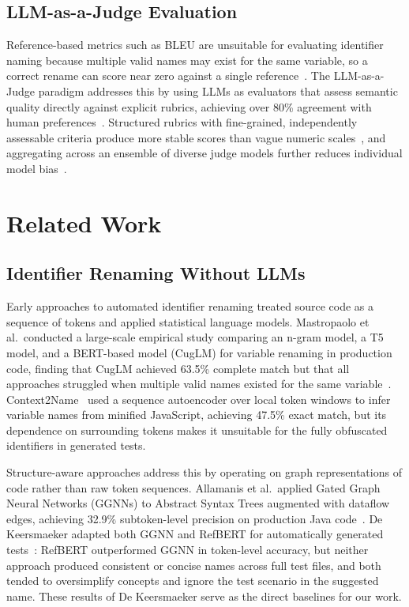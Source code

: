 \documentclass[conference]{IEEEtran}
\begin{document}
\subsection{LLM-as-a-Judge Evaluation}

Reference-based metrics such as BLEU are unsuitable for evaluating identifier
naming because multiple valid names may exist for the same variable, so a
correct rename can score near zero against a single
reference~\cite{papineni2002bleu,evtikhiev2023bleu,mastropaolo2023renaming}.
The LLM-as-a-Judge paradigm addresses this by using LLMs as evaluators that
assess semantic quality directly against explicit rubrics, achieving over 80\%
agreement with human preferences~\cite{zheng2023judging}.
Structured rubrics with fine-grained, independently assessable criteria produce
more stable scores than vague numeric scales~\cite{liu2023geval}, and
aggregating across an ensemble of diverse judge models further reduces
individual model bias~\cite{verga2024poll}.

\section{Related Work}

\subsection{Identifier Renaming Without LLMs}

Early approaches to automated identifier renaming treated source code as a
sequence of tokens and applied statistical language models.
Mastropaolo et al.\ conducted a large-scale empirical study comparing an
n-gram model, a T5 model, and a BERT-based model (CugLM) for variable renaming
in production code, finding that CugLM achieved 63.5\% complete match but that
all approaches struggled when multiple valid names existed for the same
variable~\cite{mastropaolo2023renaming}.
Context2Name~\cite{bavishi2018context2name} used a sequence autoencoder over
local token windows to infer variable names from minified JavaScript, achieving
47.5\% exact match, but its dependence on surrounding tokens makes it
unsuitable for the fully obfuscated identifiers in generated tests.

Structure-aware approaches address this by operating on graph representations
of code rather than raw token sequences.
Allamanis et al.\ applied Gated Graph Neural Networks (GGNNs) to Abstract
Syntax Trees augmented with dataflow edges, achieving 32.9\% subtoken-level
precision on production Java code~\cite{allamanis2018learning}.
De Keersmaeker adapted both GGNN and RefBERT for automatically generated
tests~\cite{dekeersmaeker2024enhancing}: RefBERT outperformed GGNN in
token-level accuracy, but neither approach produced consistent or concise names
across full test files, and both tended to oversimplify concepts and ignore the
test scenario in the suggested name.
These results of De Keersmaeker serve as the direct baselines for our work.
\end{document}
